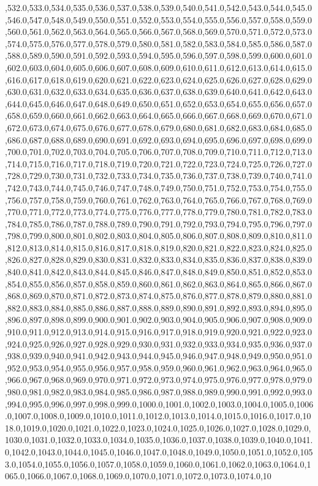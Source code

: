 \documentclass{article}
\begin{document}
,532.0,533.0,534.0,535.0,536.0,537.0,538.0,539.0,540.0,541.0,542.0,543.0,544.0,545.0,546.0,547.0,548.0,549.0,550.0,551.0,552.0,553.0,554.0,555.0,556.0,557.0,558.0,559.0,560.0,561.0,562.0,563.0,564.0,565.0,566.0,567.0,568.0,569.0,570.0,571.0,572.0,573.0,574.0,575.0,576.0,577.0,578.0,579.0,580.0,581.0,582.0,583.0,584.0,585.0,586.0,587.0,588.0,589.0,590.0,591.0,592.0,593.0,594.0,595.0,596.0,597.0,598.0,599.0,600.0,601.0,602.0,603.0,604.0,605.0,606.0,607.0,608.0,609.0,610.0,611.0,612.0,613.0,614.0,615.0,616.0,617.0,618.0,619.0,620.0,621.0,622.0,623.0,624.0,625.0,626.0,627.0,628.0,629.0,630.0,631.0,632.0,633.0,634.0,635.0,636.0,637.0,638.0,639.0,640.0,641.0,642.0,643.0,644.0,645.0,646.0,647.0,648.0,649.0,650.0,651.0,652.0,653.0,654.0,655.0,656.0,657.0,658.0,659.0,660.0,661.0,662.0,663.0,664.0,665.0,666.0,667.0,668.0,669.0,670.0,671.0,672.0,673.0,674.0,675.0,676.0,677.0,678.0,679.0,680.0,681.0,682.0,683.0,684.0,685.0,686.0,687.0,688.0,689.0,690.0,691.0,692.0,693.0,694.0,695.0,696.0,697.0,698.0,699.0,700.0,701.0,702.0,703.0,704.0,705.0,706.0,707.0,708.0,709.0,710.0,711.0,712.0,713.0,714.0,715.0,716.0,717.0,718.0,719.0,720.0,721.0,722.0,723.0,724.0,725.0,726.0,727.0,728.0,729.0,730.0,731.0,732.0,733.0,734.0,735.0,736.0,737.0,738.0,739.0,740.0,741.0,742.0,743.0,744.0,745.0,746.0,747.0,748.0,749.0,750.0,751.0,752.0,753.0,754.0,755.0,756.0,757.0,758.0,759.0,760.0,761.0,762.0,763.0,764.0,765.0,766.0,767.0,768.0,769.0,770.0,771.0,772.0,773.0,774.0,775.0,776.0,777.0,778.0,779.0,780.0,781.0,782.0,783.0,784.0,785.0,786.0,787.0,788.0,789.0,790.0,791.0,792.0,793.0,794.0,795.0,796.0,797.0,798.0,799.0,800.0,801.0,802.0,803.0,804.0,805.0,806.0,807.0,808.0,809.0,810.0,811.0,812.0,813.0,814.0,815.0,816.0,817.0,818.0,819.0,820.0,821.0,822.0,823.0,824.0,825.0,826.0,827.0,828.0,829.0,830.0,831.0,832.0,833.0,834.0,835.0,836.0,837.0,838.0,839.0,840.0,841.0,842.0,843.0,844.0,845.0,846.0,847.0,848.0,849.0,850.0,851.0,852.0,853.0,854.0,855.0,856.0,857.0,858.0,859.0,860.0,861.0,862.0,863.0,864.0,865.0,866.0,867.0,868.0,869.0,870.0,871.0,872.0,873.0,874.0,875.0,876.0,877.0,878.0,879.0,880.0,881.0,882.0,883.0,884.0,885.0,886.0,887.0,888.0,889.0,890.0,891.0,892.0,893.0,894.0,895.0,896.0,897.0,898.0,899.0,900.0,901.0,902.0,903.0,904.0,905.0,906.0,907.0,908.0,909.0,910.0,911.0,912.0,913.0,914.0,915.0,916.0,917.0,918.0,919.0,920.0,921.0,922.0,923.0,924.0,925.0,926.0,927.0,928.0,929.0,930.0,931.0,932.0,933.0,934.0,935.0,936.0,937.0,938.0,939.0,940.0,941.0,942.0,943.0,944.0,945.0,946.0,947.0,948.0,949.0,950.0,951.0,952.0,953.0,954.0,955.0,956.0,957.0,958.0,959.0,960.0,961.0,962.0,963.0,964.0,965.0,966.0,967.0,968.0,969.0,970.0,971.0,972.0,973.0,974.0,975.0,976.0,977.0,978.0,979.0,980.0,981.0,982.0,983.0,984.0,985.0,986.0,987.0,988.0,989.0,990.0,991.0,992.0,993.0,994.0,995.0,996.0,997.0,998.0,999.0,1000.0,1001.0,1002.0,1003.0,1004.0,1005.0,1006.0,1007.0,1008.0,1009.0,1010.0,1011.0,1012.0,1013.0,1014.0,1015.0,1016.0,1017.0,1018.0,1019.0,1020.0,1021.0,1022.0,1023.0,1024.0,1025.0,1026.0,1027.0,1028.0,1029.0,1030.0,1031.0,1032.0,1033.0,1034.0,1035.0,1036.0,1037.0,1038.0,1039.0,1040.0,1041.0,1042.0,1043.0,1044.0,1045.0,1046.0,1047.0,1048.0,1049.0,1050.0,1051.0,1052.0,1053.0,1054.0,1055.0,1056.0,1057.0,1058.0,1059.0,1060.0,1061.0,1062.0,1063.0,1064.0,1065.0,1066.0,1067.0,1068.0,1069.0,1070.0,1071.0,1072.0,1073.0,1074.0,10
\end{document}

